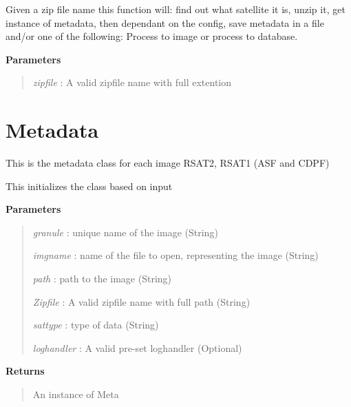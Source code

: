 \documentclass[letterpaper,10pt,english]{sphinxmanual}
\begin{document}
\begin{fulllineitems}

\begin{fulllineitems}
\label{code:SigLib.SigLib.retrieve}
Given a zip file name this function will: find out what satellite it is, unzip it, get instance of metadata, then 
dependant on the config, save metadata in a file and/or one of the following: Process to image or process to database.

\textbf{Parameters}
\begin{quote}

\emph{zipfile} : A valid zipfile name with full extention
\end{quote}

\end{fulllineitems}


\end{fulllineitems}



\section{Metadata}
\label{code:metadata}

\begin{fulllineitems}
\label{code:SigLib.Metadata}
This is the metadata class for each image RSAT2, RSAT1 (ASF and CDPF)

\begin{fulllineitems}
\label{code:SigLib.Metadata.__init__}
This initializes the class based on input

\textbf{Parameters}
\begin{quote}

\emph{granule}    : unique name of the image (String)

\emph{imgname}    : name of the file to open, representing the image (String)

\emph{path}       : path to the image (String)

\emph{Zipfile}    : A valid zipfile name with full path (String)

\emph{sattype}    : type of data (String)

\emph{loghandler} : A valid pre-set loghandler (Optional)
\end{quote}

\textbf{Returns}
\begin{quote}

An instance of Meta
\end{quote}

\end{fulllineitems}


\end{fulllineitems}
\end{document}
